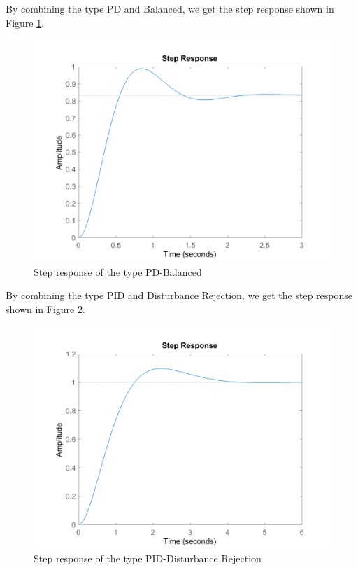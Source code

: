 \documentclass[a4paper, twocolumn, titlepage, 10pt]{article}
\begin{document}
		By combining the type PD and Balanced, we get the step response shown in Figure \ref{PD-balance-step}.
		\begin{figure}[H]
			\centering
			\includegraphics[width=\linewidth]{PD-balance-step}
			\caption{Step response of the type PD-Balanced}
			\label{PD-balance-step}
		\end{figure}
		By combining the type PID and Disturbance Rejection, we get the step response shown in Figure \ref{PID-rej-step}.
		\begin{figure}[H]
			\centering
			\includegraphics[width=\linewidth]{PID-rej-step}
			\caption{Step response of the type PID-Disturbance Rejection}
			\label{PID-rej-step}
		\end{figure}
\end{document}
